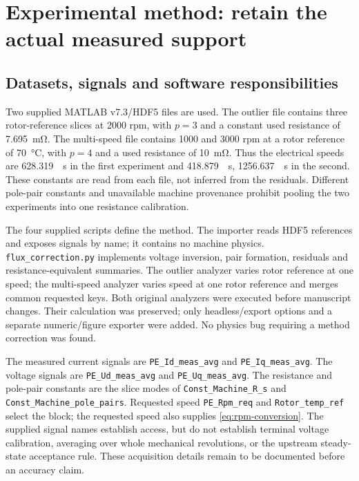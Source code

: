 \section{Experimental method: retain the actual measured support}
\label{sec:experimental-method}
\subsection{Datasets, signals and software responsibilities}
Two supplied MATLAB v7.3/HDF5 files are used. The outlier file contains
three rotor-reference slices at 2000 rpm, with $p=3$ and a constant used
resistance of \SI{7.695}{\milli\ohm}. The multi-speed file contains 1000 and
3000 rpm at a rotor reference of \SI{70}{\celsius}, with $p=4$ and a used
resistance of \SI{10}{\milli\ohm}. Thus the electrical speeds are
\SI{628.319}{\per\second} in the first experiment and
\SI{418.879}{\per\second}, \SI{1256.637}{\per\second} in the second.
These constants are read from each file, not inferred from the residuals.
Different pole-pair constants and unavailable machine provenance prohibit
pooling the two experiments into one resistance calibration.

The four supplied scripts define the method. The importer reads HDF5
references and exposes signals by name; it contains no machine physics.
\texttt{flux\_correction.py} implements voltage inversion, pair formation,
residuals and resistance-equivalent summaries. The outlier analyzer varies
rotor reference at one speed; the multi-speed analyzer varies speed at one
rotor reference and merges common requested keys. Both original analyzers
were executed before manuscript changes. Their calculation was preserved;
only headless/export options and a separate numeric/figure exporter were
added. No physics bug requiring a method correction was found.

The measured current signals are \texttt{PE\_Id\_meas\_avg} and
\texttt{PE\_Iq\_meas\_avg}. The voltage signals are
\texttt{PE\_Ud\_meas\_avg} and \texttt{PE\_Uq\_meas\_avg}.
The resistance and pole-pair constants are the
slice modes of \texttt{Const\_Machine\_R\_s} and
\texttt{Const\_Machine\_pole\_pairs}. Requested speed
\texttt{PE\_Rpm\_req} and \texttt{Rotor\_temp\_ref} select the block;
the requested speed also supplies \cref{eq:rpm-conversion}.
The supplied signal names establish access, but do not establish terminal
voltage calibration, averaging over whole mechanical revolutions, or the
upstream steady-state acceptance rule. These acquisition details remain to
be documented before an accuracy claim.

